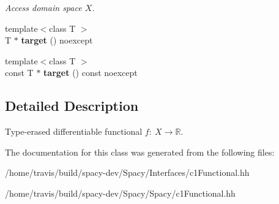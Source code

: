 \begin{DoxyCompactItemize}
\begin{DoxyCompactList}\small\item\em \-Access domain space $X$. \end{DoxyCompactList}\item 
\hypertarget{classSpacy_1_1C1Functional_adf7c0fc5a81009ebf4f8c5d9bdb9ec98}{{\footnotesize template$<$class T $>$ }\\\-T $\ast$ {\bfseries target} () noexcept}\label{classSpacy_1_1C1Functional_adf7c0fc5a81009ebf4f8c5d9bdb9ec98}

\item 
\hypertarget{classSpacy_1_1C1Functional_aa016d1671e43b875064cf3d9d9bb6351}{{\footnotesize template$<$class T $>$ }\\const \-T $\ast$ {\bfseries target} () const noexcept}\label{classSpacy_1_1C1Functional_aa016d1671e43b875064cf3d9d9bb6351}

\end{DoxyCompactItemize}


\subsection{\-Detailed \-Description}
\-Type-\/erased differentiable functional $f:\ X \to \mathbb{R} $. 

\-The documentation for this class was generated from the following files\-:\begin{DoxyCompactItemize}
\item 
/home/travis/build/spacy-\/dev/\-Spacy/\-Interfaces/c1\-Functional.\-hh\item 
/home/travis/build/spacy-\/dev/\-Spacy/\-Spacy/c1\-Functional.\-hh\end{DoxyCompactItemize}
